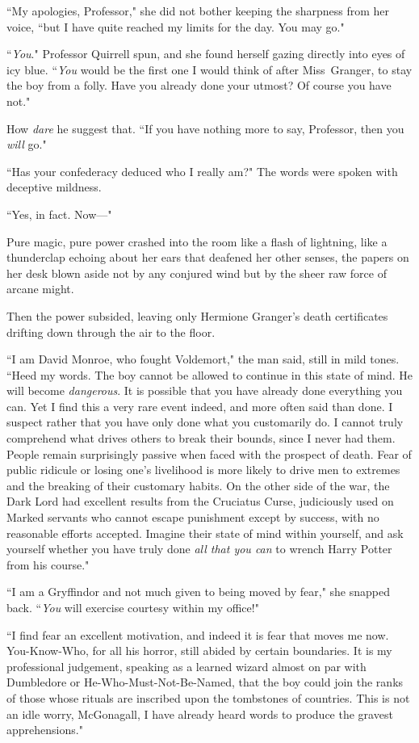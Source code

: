 ``My apologies, Professor," she did not bother keeping the sharpness from her voice, ``but I have quite reached my limits for the day. You may go."

``\emph{You}." Professor Quirrell spun, and she found herself gazing directly into eyes of icy blue. ``\emph{You} would be the first one I would think of after Miss~Granger, to stay the boy from a folly. Have you already done your utmost? Of course you have not."

How \emph{dare} he suggest that. ``If you have nothing more to say, Professor, then you \emph{will} go."

``Has your confederacy deduced who I really am?" The words were spoken with deceptive mildness.

``Yes, in fact. Now—"

Pure magic, pure power crashed into the room like a flash of lightning, like a thunderclap echoing about her ears that deafened her other senses, the papers on her desk blown aside not by any conjured wind but by the sheer raw force of arcane might.

Then the power subsided, leaving only Hermione Granger's death certificates drifting down through the air to the floor.

``I am David Monroe, who fought Voldemort," the man said, still in mild tones. ``Heed my words. The boy cannot be allowed to continue in this state of mind. He will become \emph{dangerous}. It is possible that you have already done everything you can. Yet I find this a very rare event indeed, and more often said than done. I suspect rather that you have only done what you customarily do. I cannot truly comprehend what drives others to break their bounds, since I never had them. People remain surprisingly passive when faced with the prospect of death. Fear of public ridicule or losing one's livelihood is more likely to drive men to extremes and the breaking of their customary habits. On the other side of the war, the Dark Lord had excellent results from the Cruciatus Curse, judiciously used on Marked servants who cannot escape punishment except by success, with no reasonable efforts accepted. Imagine their state of mind within yourself, and ask yourself whether you have truly done \emph{all that you can} to wrench Harry Potter from his course."

``I am a Gryffindor and not much given to being moved by fear," she snapped back. ``\emph{You} will exercise courtesy within my office!"

``I find fear an excellent motivation, and indeed it is fear that moves me now. You-Know-Who, for all his horror, still abided by certain boundaries. It is my professional judgement, speaking as a learned wizard almost on par with Dumbledore or He-Who-Must-Not-Be-Named, that the boy could join the ranks of those whose rituals are inscribed upon the tombstones of countries. This is not an idle worry, McGonagall, I have already heard words to produce the gravest apprehensions."

